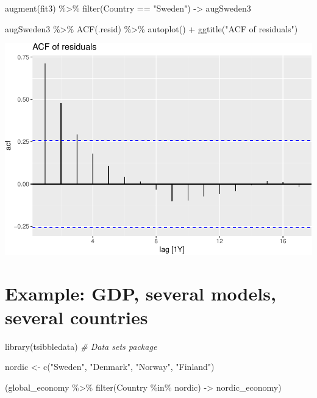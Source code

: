 \documentclass[
]{book}
\newenvironment{Shaded}{\begin{snugshade}}{\end{snugshade}}
\newcommand{\CommentTok}[1]{\textcolor[rgb]{0.56,0.35,0.01}{\textit{#1}}}
\newcommand{\FunctionTok}[1]{\textcolor[rgb]{0.00,0.00,0.00}{#1}}
\newcommand{\NormalTok}[1]{#1}
\newcommand{\OtherTok}[1]{\textcolor[rgb]{0.56,0.35,0.01}{#1}}
\newcommand{\SpecialCharTok}[1]{\textcolor[rgb]{0.00,0.00,0.00}{#1}}
\newcommand{\StringTok}[1]{\textcolor[rgb]{0.31,0.60,0.02}{#1}}
\begin{document}
\begin{Shaded}
\begin{Highlighting}[]
\FunctionTok{augment}\NormalTok{(fit3) }\SpecialCharTok{\%\textgreater{}\%} \FunctionTok{filter}\NormalTok{(Country }\SpecialCharTok{==} \StringTok{"Sweden"}\NormalTok{) }\OtherTok{{-}\textgreater{}}\NormalTok{ augSweden3}

\NormalTok{augSweden3 }\SpecialCharTok{\%\textgreater{}\%}
  \FunctionTok{ACF}\NormalTok{(.resid) }\SpecialCharTok{\%\textgreater{}\%}
  \FunctionTok{autoplot}\NormalTok{() }\SpecialCharTok{+} \FunctionTok{ggtitle}\NormalTok{(}\StringTok{"ACF of residuals"}\NormalTok{)}
\end{Highlighting}
\end{Shaded}

\includegraphics{graphics/unnamed-chunk-69-1.pdf}

\hypertarget{example-gdp-several-models-several-countries}{%
\section{Example: GDP, several models, several countries}\label{example-gdp-several-models-several-countries}}

\begin{Shaded}
\begin{Highlighting}[]
\FunctionTok{library}\NormalTok{(tsibbledata) }\CommentTok{\# Data sets package}

\NormalTok{nordic }\OtherTok{\textless{}{-}} \FunctionTok{c}\NormalTok{(}\StringTok{"Sweden"}\NormalTok{, }\StringTok{"Denmark"}\NormalTok{, }\StringTok{"Norway"}\NormalTok{, }\StringTok{"Finland"}\NormalTok{)}

\NormalTok{(global\_economy }\SpecialCharTok{\%\textgreater{}\%} \FunctionTok{filter}\NormalTok{(Country }\SpecialCharTok{\%in\%}\NormalTok{ nordic) }\OtherTok{{-}\textgreater{}}\NormalTok{ nordic\_economy)}
\end{Highlighting}
\end{Shaded}
\end{document}
